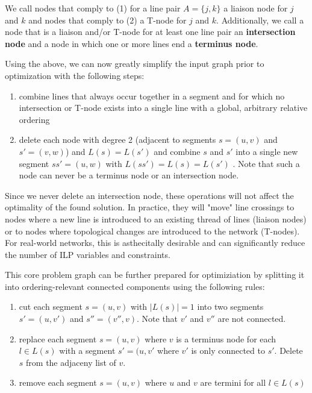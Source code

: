 \documentclass{llncs}
\begin{document}
We call nodes that comply to (1) for a line pair $A = \{j, k\}$ a liaison node for $j$ and $k$ and nodes that comply to (2) a T-node for $j$ and $k$. Additionally, we call a node that is a liaison and/or T-node for at least one line pair an \textbf{intersection node} and a node in which one or more lines end a \textbf{terminus node}.

Using the above, we can now greatly simplify the input graph prior to optimization with the following steps:

\begin{enumerate}
\item combine lines that always occur together in a segment and for which no intersection or T-node exists into a single line with a global, arbitrary relative ordering
\item delete each node with degree 2 (adjacent to segments $s = (u, v)$ and $s' = (v, w)$) and $L(s) = L(s')$ and combine $s$ and $s'$ into a single new segment $ss' = (u, w)$ with $L(ss') = L(s) = L(s')$ . Note that such a node can never be a terminus node or an intersection node.
\end{enumerate}

Since we never delete an intersection node, these operations will not affect the optimality of the found solution. In practice, they will "move" line crossings to nodes where a new line is introduced to an existing thread of lines (liaison nodes) or to nodes where topological changes are introduced to the network (T-nodes). For real-world networks, this is asthecitally desirable and can significantly reduce the number of ILP variables and constraints.

This core problem graph can be further prepared for optimiziation by splitting it into ordering-relevant connected components using the following rules:

\begin{enumerate}
	\item cut each segment $s = (u, v)$ with $|L(s)| = 1$ into two segments $s' = (u, v')$ and $s'' = (v'', v)$. Note that $v'$ and $v''$ are not connected.
	\item replace each segment $s = (u, v)$ where $v$ is a terminus node for each $l \in L(s)$ with a segment $s' = (u, v'$ where $v'$ is only connected to $s'$. Delete $s$ from the adjaceny list of $v$.
	\item remove each segment $s = (u, v)$ where $u$ and $v$ are termini for all $l \in L(s)$
\end{enumerate}
\end{document}
